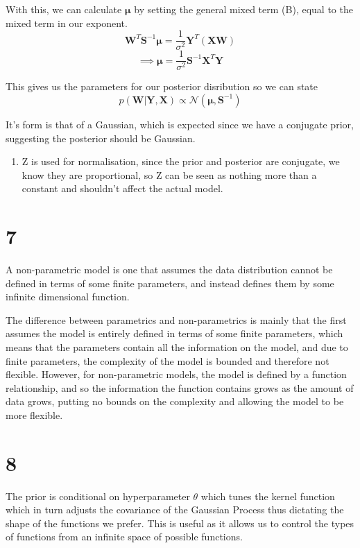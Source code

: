 \documentclass[11pt]{article}
\providecommand{\tightlist}{%
      \setlength{\itemsep}{0pt}\setlength{\parskip}{0pt}}
\begin{document}
With this, we can calculate \(\boldsymbol{\mu}\) by setting the general
mixed term (B), equal to the mixed term in our exponent.
\[\boldsymbol{W}^T\boldsymbol{S}^{-1}\boldsymbol{\mu} = \frac{1}{\sigma^2}\boldsymbol{Y}^T(\boldsymbol{XW})\]
\[\implies \boldsymbol{\mu} = \frac{1}{\sigma^2}\boldsymbol{S}^{-1}\boldsymbol{X}^T\boldsymbol{Y}\]

This gives us the parameters for our posterior disribution so we can
state
\[p(\boldsymbol{W}|\boldsymbol{Y}, \boldsymbol{X}) \propto \mathcal{N}(\boldsymbol{\mu},\boldsymbol{S}^{-1}) \]

It's form is that of a Gaussian, which is expected since we have a
conjugate prior, suggesting the posterior should be Gaussian.

\begin{enumerate}
\def\labelenumi{\alph{enumi})}
\setcounter{enumi}{2}
\tightlist
\item
  Z is used for normalisation, since the prior and posterior are
  conjugate, we know they are proportional, so Z can be seen as nothing
  more than a constant and shouldn't affect the actual model.
\end{enumerate}

    \section*{7}\label{section}

A non-parametric model is one that assumes the data distribution cannot
be defined in terms of some finite parameters, and instead defines them
by some infinite dimensional function.

The difference between parametrics and non-parametrics is mainly that
the first assumes the model is entirely defined in terms of some finite
parameters, which means that the parameters contain all the information
on the model, and due to finite parameters, the complexity of the model
is bounded and therefore not flexible. However, for non-parametric
models, the model is defined by a function relationship, and so the
information the function contains grows as the amount of data grows,
putting no bounds on the complexity and allowing the model to be more
flexible.

    \section*{8}\label{section}

The prior is conditional on hyperparameter \(\theta\) which tunes the
kernel function which in turn adjusts the covariance of the Gaussian
Process thus dictating the shape of the functions we prefer. This is
useful as it allows us to control the types of functions from an
infinite space of possible functions.
\end{document}
